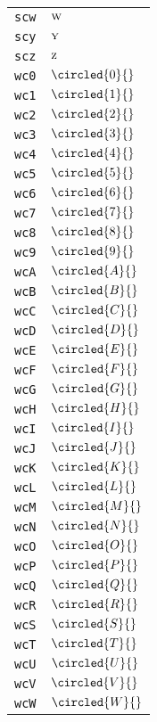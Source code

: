 \begin{longtable}{ll}
\texttt{scw}&${}{\textsc{w}}{}$\\
\texttt{scy}&${}{\textsc{y}}{}$\\
\texttt{scz}&${}{\textsc{z}}{}$\\
\texttt{wc0}&${}\circled{0}{}$\\
\texttt{wc1}&${}\circled{1}{}$\\
\texttt{wc2}&${}\circled{2}{}$\\
\texttt{wc3}&${}\circled{3}{}$\\
\texttt{wc4}&${}\circled{4}{}$\\
\texttt{wc5}&${}\circled{5}{}$\\
\texttt{wc6}&${}\circled{6}{}$\\
\texttt{wc7}&${}\circled{7}{}$\\
\texttt{wc8}&${}\circled{8}{}$\\
\texttt{wc9}&${}\circled{9}{}$\\
\texttt{wcA}&${}\circled{A}{}$\\
\texttt{wcB}&${}\circled{B}{}$\\
\texttt{wcC}&${}\circled{C}{}$\\
\texttt{wcD}&${}\circled{D}{}$\\
\texttt{wcE}&${}\circled{E}{}$\\
\texttt{wcF}&${}\circled{F}{}$\\
\texttt{wcG}&${}\circled{G}{}$\\
\texttt{wcH}&${}\circled{H}{}$\\
\texttt{wcI}&${}\circled{I}{}$\\
\texttt{wcJ}&${}\circled{J}{}$\\
\texttt{wcK}&${}\circled{K}{}$\\
\texttt{wcL}&${}\circled{L}{}$\\
\texttt{wcM}&${}\circled{M}{}$\\
\texttt{wcN}&${}\circled{N}{}$\\
\texttt{wcO}&${}\circled{O}{}$\\
\texttt{wcP}&${}\circled{P}{}$\\
\texttt{wcQ}&${}\circled{Q}{}$\\
\texttt{wcR}&${}\circled{R}{}$\\
\texttt{wcS}&${}\circled{S}{}$\\
\texttt{wcT}&${}\circled{T}{}$\\
\texttt{wcU}&${}\circled{U}{}$\\
\texttt{wcV}&${}\circled{V}{}$\\
\texttt{wcW}&${}\circled{W}{}$\\

\end{longtable}
